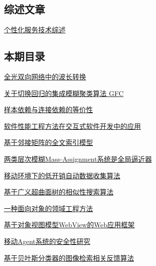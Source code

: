 \documentclass[a4paper]{article}
\begin{document}
\subsection{综述文章}
\href{http://www.jos.org.cn/ch/reader/download_pdf.aspx?file_no=20021007&year_id=2002&quarter_id=10&falg=1}{个性化服务技术综述}

\subsection{本期目录}
\href{http://www.jos.org.cn/ch/reader/download_pdf.aspx?file_no=20021001&year_id=2002&quarter_id=10&falg=1}{全光双向网络中的波长转换}

\href{http://www.jos.org.cn/ch/reader/download_pdf.aspx?file_no=20021002&year_id=2002&quarter_id=10&falg=1}{关于切换回归的集成模糊聚类算法 GFC}

\href{http://www.jos.org.cn/ch/reader/download_pdf.aspx?file_no=20021003&year_id=2002&quarter_id=10&falg=1}{样本依赖与连接依赖的等价性}

\href{http://www.jos.org.cn/ch/reader/download_pdf.aspx?file_no=20021004&year_id=2002&quarter_id=10&falg=1}{软件性能工程方法在交互式软件开发中的应用}

\href{http://www.jos.org.cn/ch/reader/download_pdf.aspx?file_no=20021005&year_id=2002&quarter_id=10&falg=1}{基于邻接矩阵的全文索引模型}

\href{http://www.jos.org.cn/ch/reader/download_pdf.aspx?file_no=20021006&year_id=2002&quarter_id=10&falg=1}{两类层次模糊Mass-Assignment系统是全局逼近器}

\href{http://www.jos.org.cn/ch/reader/download_pdf.aspx?file_no=20021008&year_id=2002&quarter_id=10&falg=1}{移动环境下的低开销自动数据收集算法}

\href{http://www.jos.org.cn/ch/reader/download_pdf.aspx?file_no=20021009&year_id=2002&quarter_id=10&falg=1}{基于广义超曲面树的相似性搜索算法}

\href{http://www.jos.org.cn/ch/reader/download_pdf.aspx?file_no=20021010&year_id=2002&quarter_id=10&falg=1}{一种面向对象的领域工程方法}

\href{http://www.jos.org.cn/ch/reader/download_pdf.aspx?file_no=20021011&year_id=2002&quarter_id=10&falg=1}{基于对象视图模型WebView的Web应用框架}

\href{http://www.jos.org.cn/ch/reader/download_pdf.aspx?file_no=20021012&year_id=2002&quarter_id=10&falg=1}{移动Agent系统的安全性研究}

\href{http://www.jos.org.cn/ch/reader/download_pdf.aspx?file_no=20021013&year_id=2002&quarter_id=10&falg=1}{基于贝叶斯分类器的图像检索相关反馈算法}
\end{document}
